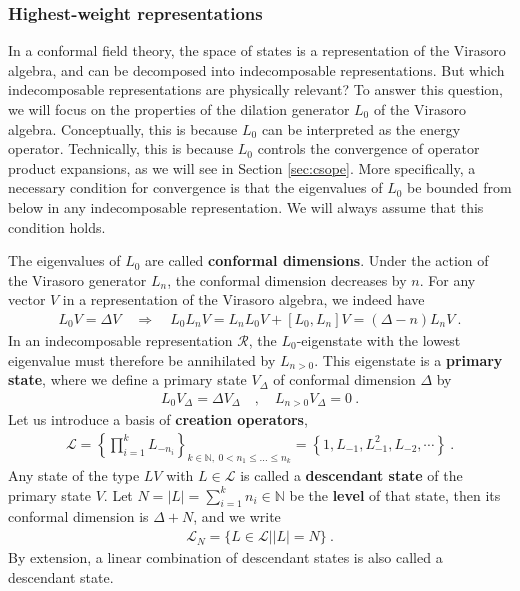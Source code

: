 \documentclass[12pt, a4paper]{article}
\newcommand{\myindex}[1]{\textbf{\boldmath #1}}
\begin{document}
\subsubsection{Highest-weight representations}\label{sec:hwr}

In a conformal field theory, the space of states is a representation of the Virasoro algebra, and can be decomposed into indecomposable representations. But which indecomposable representations are physically relevant? To answer this question, we will focus on the properties of the dilation generator $L_0$ of the Virasoro algebra. Conceptually, this is because $L_0$ can be interpreted as the energy operator. Technically, this is because $L_0$ controls the convergence of operator product expansions, as we will see in Section \ref{sec:csope}. More specifically, a necessary condition for convergence is that the eigenvalues of $L_0$ be bounded from below in any indecomposable representation. We will always assume that this condition holds.

The eigenvalues of $L_0$ are called \myindex{conformal dimensions}. Under the action of the Virasoro generator $L_n$, the conformal dimension decreases by $n$. For any vector $V$ in a representation of the Virasoro algebra, we indeed have 
\begin{align}
 L_0V{} = \Delta V{} \quad \Rightarrow\quad  L_0 L_nV{} = L_nL_0V{} + [L_0, L_n] V{}  = (\Delta-n)L_nV{} \ .
\end{align}
In an indecomposable representation $\mathcal{R}$, the $L_0$-eigenstate with the lowest eigenvalue must therefore be annihilated by $L_{n>0}$. This eigenstate is a \myindex{primary state}, where we define a primary state $V_\Delta$ of conformal dimension $\Delta$ by 
\begin{align}
  \boxed{L_0 V_\Delta = \Delta V_\Delta \quad , \quad L_{n>0} V_\Delta = 0}\ .
 \end{align}
Let us introduce a basis of \myindex{creation operators},
\begin{align}
 \mathcal{L} = \left\{\prod_{i=1}^k L_{-n_i} \right\}_{k\in\mathbb{N},\ 0<n_1\leq \dots \leq n_k}=\left\{1, L_{-1}, L_{-1}^2, L_{-2},\cdots \right\}\ .
 \label{lcm}
\end{align}
Any state of the type $L V{}$ with $L\in\mathcal{L}$ is called a \myindex{descendant state} of the primary state $V$. Let  $N=|L|=\sum_{i=1}^k n_i \in\mathbb{N}$ be the  \myindex{level} of that state, then its conformal dimension is $\Delta+N$, and we write
\begin{align}
 \mathcal{L}_N = \Big\{ L\in\mathcal{L}\Big| |L|=N\Big\}\ . 
\label{ln}
 \end{align}
By extension, a linear combination of descendant states is also called a descendant state. 
\end{document}
